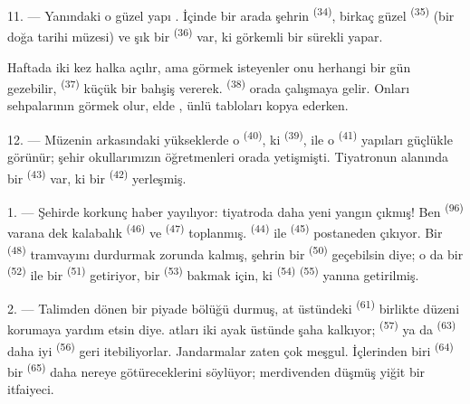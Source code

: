 11. --- Yanındaki o güzel yapı . İçinde bir arada şehrin
 \textsuperscript{(34)}, birkaç güzel  \textsuperscript{(35)} (bir doğa tarihi müzesi) ve şık bir
 \textsuperscript{(36)} var, ki görkemli bir sürekli
 yapar.

Haftada iki kez halka açılır, ama görmek isteyenler onu herhangi bir gün
gezebilir,  \textsuperscript{(37)} küçük bir bahşiş vererek.
 \textsuperscript{(38)} orada çalışmaya gelir. Onları
sehpalarının  görmek olur, elde , ünlü tabloları
kopya ederken.

12. --- Müzenin arkasındaki yükseklerde o 
\textsuperscript{(40)}, ki  \textsuperscript{(39)}, ile
o
 \textsuperscript{(41)} yapıları güçlükle görünür;
şehir okullarımızın öğretmenleri orada yetişmişti. Tiyatronun alanında bir
 \textsuperscript{(43)} var, ki bir 
\textsuperscript{(42)} yerleşmiş.

\VUsaut{5.0mm}
\VUsaut{3.0mm}

\VUsaut{3.4mm}

1. --- Şehirde korkunç haber yayılıyor: tiyatroda daha yeni yangın çıkmış!
Ben  \textsuperscript{(96)} varana dek kalabalık
 \textsuperscript{(46)} ve 
\textsuperscript{(47)} toplanmış. 
\textsuperscript{(44)} ile  \textsuperscript{(45)}
postaneden çıkıyor. Bir  \textsuperscript{(48)}
tramvayını durdurmak zorunda kalmış, şehrin bir 
\textsuperscript{(50)} geçebilsin diye; o da bir 
\textsuperscript{(52)} ile bir  \textsuperscript{(51)}
getiriyor, bir  \textsuperscript{(53)} bakmak için, ki
 \textsuperscript{(54)} 
\textsuperscript{(55)} yanına getirilmiş.

2. --- Talimden dönen bir piyade bölüğü durmuş, at üstündeki
 \textsuperscript{(61)} birlikte düzeni korumaya
yardım etsin diye.  atları iki ayak üstünde şaha kalkıyor;
 \textsuperscript{(57)} ya da 
\textsuperscript{(63)} daha iyi  \textsuperscript{(56)}
geri itebiliyorlar. Jandarmalar zaten çok meşgul. İçlerinden biri
 \textsuperscript{(64)} bir 
\textsuperscript{(65)} daha nereye götüreceklerini söylüyor; merdivenden
düşmüş yiğit bir itfaiyeci.

